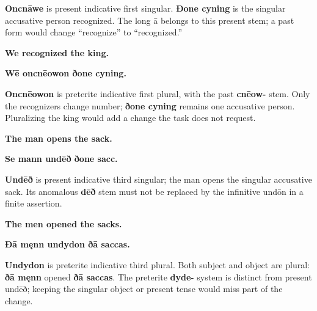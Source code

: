 \textbf{Oncnāwe} is present indicative first singular. \textbf{Ðone cyning} is the singular accusative person recognized. The long ā belongs to this present stem; a past form would change “recognize” to “recognized.”

\par\begin{minipage}{\linewidth}\raggedright
\textbf{We recognized the king.}

\textbf{Wē oncnēowon ðone cyning.}
\end{minipage}\par

\textbf{Oncnēowon} is preterite indicative first plural, with the past \textbf{cnēow-} stem. Only the recognizers change number; \textbf{ðone cyning} remains one accusative person. Pluralizing the king would add a change the task does not request.

\par\begin{minipage}{\linewidth}\raggedright
\textbf{The man opens the sack.}

\textbf{Se mann undēð ðone sacc.}
\end{minipage}\par

\textbf{Undēð} is present indicative third singular; the man opens the singular accusative sack. Its anomalous \textbf{dēð} stem must not be replaced by the infinitive undōn in a finite assertion.

\par\begin{minipage}{\linewidth}\raggedright
\textbf{The men opened the sacks.}

\textbf{Ðā męnn undydon ðā saccas.}
\end{minipage}\par

\textbf{Undydon} is preterite indicative third plural. Both subject and object are plural: \textbf{ðā męnn} opened \textbf{ðā saccas}. The preterite \textbf{dyde-} system is distinct from present undēð; keeping the singular object or present tense would miss part of the change.

